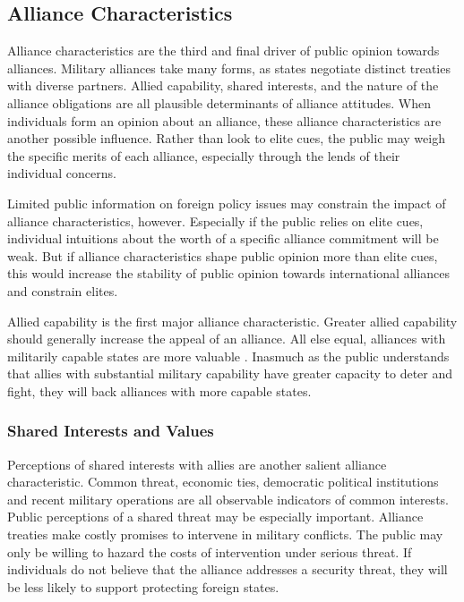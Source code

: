 \documentclass[12pt]{article}
\begin{document}
\subsection{Alliance Characteristics}

Alliance characteristics are the third and final driver of public opinion towards alliances.
Military alliances take many forms, as states negotiate distinct treaties with diverse partners.
Allied capability, shared interests, and the nature of the alliance obligations are all plausible determinants of alliance attitudes.   
When individuals form an opinion about an alliance, these alliance characteristics are another possible influence. 
Rather than look to elite cues, the public may weigh the specific merits of each alliance, especially through the lends of their individual concerns. 


Limited public information on foreign policy issues may constrain the impact of alliance characteristics, however. 
Especially if the public relies on elite cues, individual intuitions about the worth of a specific alliance commitment will be weak. 
But if alliance characteristics shape public opinion more than elite cues, this would increase the stability of public opinion towards international alliances and constrain elites. 


Allied capability is the first major alliance characteristic.
Greater allied capability should generally increase the appeal of an alliance. 
All else equal, alliances with militarily capable states are more valuable \citep{Johnsonetal2015}. 
Inasmuch as the public understands that allies with substantial military capability have greater capacity to deter and fight, they will back alliances with more capable states. 


\subsubsection*{Shared Interests and Values}

Perceptions of shared interests with allies are another salient alliance characteristic. 
Common threat, economic ties, democratic political institutions and recent military operations are all observable indicators of common interests. 
Public perceptions of a shared threat may be especially important. 
Alliance treaties make costly promises to intervene in military conflicts. 
The public may only be willing to hazard the costs of intervention under serious threat. 
If individuals do not believe that the alliance addresses a security threat, they will be less likely to support protecting foreign states. 
\end{document}
